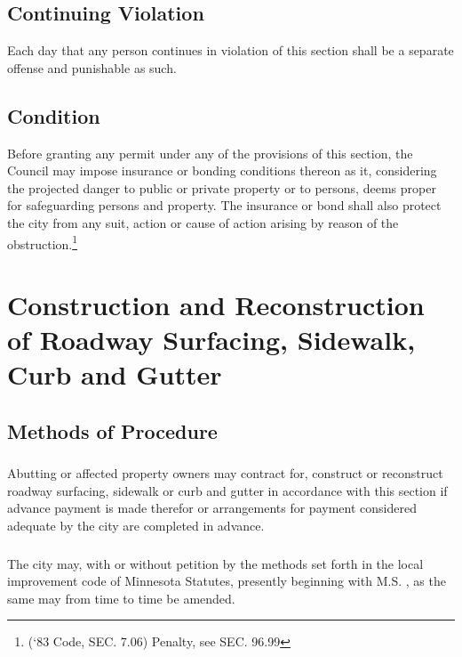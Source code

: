 \subsection{Continuing Violation}
Each day that any person continues in violation of this section shall be a separate offense and punishable as such.
\subsection{Condition}
Before granting any permit under any of the provisions of this section, the Council may impose insurance or bonding conditions thereon as it, considering the projected danger to public or private property or to persons, deems proper for safeguarding persons and property.  The insurance or bond shall also protect the city from any suit, action or cause of action arising by reason of the obstruction.\footnote{(‘83 Code, SEC. 7.06)  Penalty, see SEC. 96.99}

\section{Construction and Reconstruction of Roadway Surfacing, Sidewalk, Curb and Gutter}
\subsection{Methods of Procedure}
\subsubsection{}
Abutting or affected property owners may contract for, construct or reconstruct roadway surfacing, sidewalk or curb and gutter in accordance with this section if advance payment is made therefor or arrangements for payment considered adequate by the city are completed in advance.
\subsubsection{}
The city may, with or without petition by the methods set forth in the local improvement code of Minnesota Statutes, presently beginning with M.S. , as the same may from time to time be amended.
